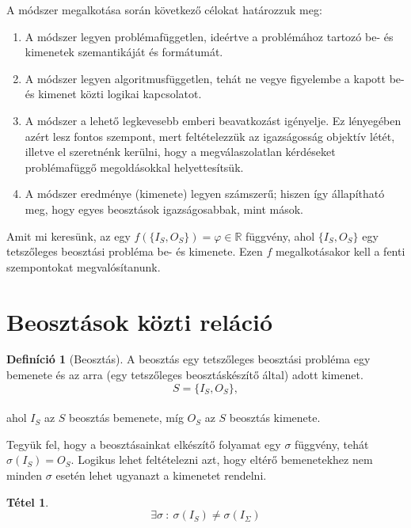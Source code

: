 \documentclass{article}
\theoremstyle{definition}
\newtheorem{definition}{Definíció}[section]
\newtheorem{theorem}{Tétel}[section]
\newcommand{\set}[1]{ \{ {#1} \} }
\begin{document}
\begin{multicols}{2}
    A módszer megalkotása során következő célokat határozzuk meg:
    \begin{enumerate}
        \item A módszer legyen problémafüggetlen, ideértve a problémához tartozó be- és kimenetek szemantikáját és formátumát.
        \item A módszer legyen algoritmusfüggetlen, tehát ne vegye figyelembe a kapott be- és kimenet közti logikai kapcsolatot.
        \item A módszer a lehető legkevesebb emberi beavatkozást igényelje. Ez lényegében azért lesz fontos szempont, mert feltételezzük az igazságosság objektív létét, illetve el szeretnénk kerülni, hogy a megválaszolatlan kérdéseket problémafüggő megoldásokkal helyettesítsük.
        \item A módszer eredménye (kimenete) legyen számszerű; hiszen így állapítható meg, hogy egyes beosztások igazságosabbak, mint mások.
    \end{enumerate}
    
    Amit mi keresünk, az egy $f( \set{ I_S, O_S }) = \varphi \in \mathbb{R}$ függvény, ahol $\set{I_S, O_S}$ egy tetszőleges beosztási probléma be- és kimenete. Ezen $f$ megalkotásakor kell a fenti szempontokat megvalósítanunk.

\section{Beosztások közti reláció}
    
    \begin{definition}[Beosztás]
        A beosztás egy tetszőleges beosztási probléma egy bemenete és az arra (egy tetszőleges beosztáskészítő által) adott kimenet.
        \begin{equation} S = \set{I_S, O_S},\end{equation} 
        \\ ahol $I_S$ az $S$ beosztás bemenete, míg $O_S$ az $S$ beosztás kimenete.

    \end{definition}
    
    Tegyük fel, hogy a beosztásainkat elkészítő folyamat egy $\sigma$ függvény, tehát $\sigma(I_S) = O_S$. Logikus lehet feltételezni azt, hogy eltérő bemenetekhez nem minden $\sigma$ esetén lehet ugyanazt a kimenetet rendelni.
    

    \begin{theorem}
        \begin{equation}
            \exists \sigma \ : \ 
            \sigma(I_S)
            \not= 
            \sigma(I_\Sigma)
        \end{equation}
    \end{theorem}
    

\end{multicols}
\end{document}
